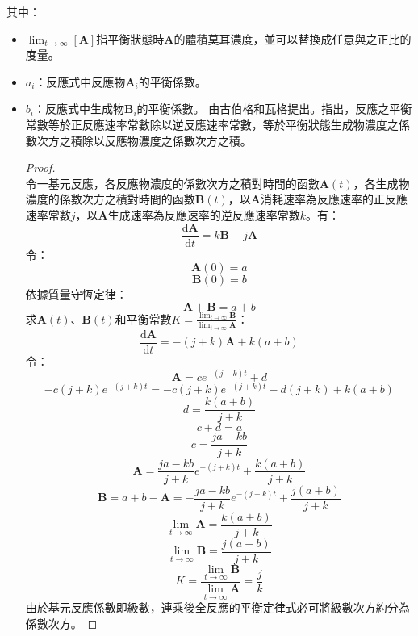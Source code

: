 \documentclass[a4paper,12pt]{report}
\begin{document}
其中：
\begin{itemize}
\item $\lim_{t\to\infty}[\mathbf{A}]$指平衡狀態時$\mathbf{A}$的體積莫耳濃度，並可以替換成任意與之正比的度量。
\item $a_i$：反應式中反應物$\mathbf{A}_i$的平衡係數。
\item $b_i$：反應式中生成物$\mathbf{B}_i$的平衡係數。
\eit
{}
由古伯格和瓦格提出。指出，反應之平衡常數等於正反應速率常數除以逆反應速率常數，等於平衡狀態生成物濃度之係數次方之積除以反應物濃度之係數次方之積。
\begin{proof}\mbox{}\\
令一基元反應，各反應物濃度的係數次方之積對時間的函數$\mathbf{A}(t)$，各生成物濃度的係數次方之積對時間的函數$\mathbf{B}(t)$，以$\mathbf{A}$消耗速率為反應速率的正反應速率常數$j$，以$\mathbf{A}$生成速率為反應速率的逆反應速率常數$k$。有：
\[\frac{\mathrm{d}\mathbf{A}}{\mathrm{d}t}=k\mathbf{B}-j\mathbf{A}\]
令：
\[\mathbf{A}(0)=a\]
\[\mathbf{B}(0)=b\]
依據質量守恆定律：
\[\mathbf{A}+\mathbf{B}=a+b\]
求$\mathbf{A}(t)$、$\mathbf{B}(t)$和平衡常數$K=\frac{\lim_{t\to\infty}\mathbf{B}}{\lim_{t\to\infty}\mathbf{A}}$：
\[\frac{\mathrm{d}\mathbf{A}}{\mathrm{d}t}=-(j+k)\mathbf{A}+k(a+b)\]
令：
\[\mathbf{A}=ce^{-(j+k)t}+d\]
\[-c(j+k)e^{-(j+k)t}=-c(j+k)e^{-(j+k)t}-d(j+k)+k(a+b)\]
\[d=\frac{k(a+b)}{j+k}\]
\[c+d=a\]
\[c=\frac{ja-kb}{j+k}\]
\[\mathbf{A}=\frac{ja-kb}{j+k}e^{-(j+k)t}+\frac{k(a+b)}{j+k}\]
\[\mathbf{B}=a+b-\mathbf{A}=-\frac{ja-kb}{j+k}e^{-(j+k)t}+\frac{j(a+b)}{j+k}\]
\[\lim_{t\to\infty}\mathbf{A}=\frac{k(a+b)}{j+k}\]
\[\lim_{t\to\infty}\mathbf{B}=\frac{j(a+b)}{j+k}\]
\[K=\frac{\lim_{t\to\infty}\mathbf{B}}{\lim_{t\to\infty}\mathbf{A}}=\frac{j}{k}\]
由於基元反應係數即級數，連乘後全反應的平衡定律式必可將級數次方約分為係數次方。
\end{proof}

\end{itemize}
\end{document}
